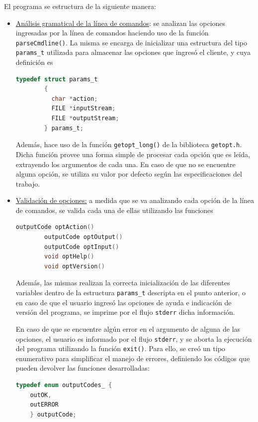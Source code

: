 El programa se estructura de la siguiente manera:
\begin{itemize}
	\item \underline{Análisis gramatical de la línea de comandos}: se analizan las opciones ingresadas por la línea de comandos haciendo uso de la función \texttt{parseCmdline()}. La misma se encarga de inicializar una estructura del tipo \texttt{params\_t} utilizada para almacenar las opciones que ingresó el cliente, y cuya definición es
	\begin{lstlisting}[language=C, style=StyleC]
    	typedef struct params_t
        {
          char *action;
          FILE *inputStream;
          FILE *outputStream;
        } params_t;
	\end{lstlisting}
	Además, hace uso de la función \texttt{getopt\_long()} de la biblioteca \texttt{getopt.h}. Dicha función provee una forma simple de procesar cada opción que es leída, extrayendo los argumentos de cada una. En caso de que no se encuentre alguna opción, se utiliza su valor por defecto según las especificaciones del trabajo.

	\item \underline{Validación de opciones:} a medida que se va analizando cada opción de la línea de comandos, se valida cada una de ellas utilizando las funciones 
	\begin{lstlisting}[language=C, style=StyleC]
    	outputCode optAction()
        outputCode optOutput()
        outputCode optInput()
        void optHelp()
        void optVersion()
    \end{lstlisting}
    Además, las mismas realizan la correcta inicialización de las diferentes variables dentro de la estructura \texttt{params\_t} descripta en el punto anterior, o en caso de que el usuario ingresó las opciones de ayuda e indicación de versión del programa, se imprime por el flujo \texttt{stderr} dicha información.
    
	En caso de que se encuentre algún error en el argumento de alguna de las opciones, el usuario es informado por el flujo \texttt{stderr}, y se aborta la ejecución del programa utilizando la función \texttt{exit()}. Para ello, se creó un tipo enumerativo para simplificar el manejo de errores, definiendo los códigos que pueden devolver las funciones desarrolladas:
	\begin{lstlisting}[language=C, style=StyleC]
	typedef enum outputCodes_ {
	outOK,
	outERROR
	} outputCode;
	\end{lstlisting}
	

\end{itemize}
